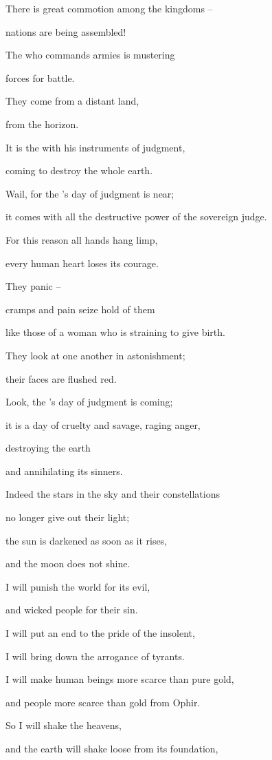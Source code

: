 {\par }{\Q There is great
commotion
among the kingdoms –
\par }{\Q nations
are being assembled!
\par }{\Q The
{}
who commands armies
is mustering
\par }{\Q forces
for battle.
\par }{\Q {}They come
from a distant
land,
\par }{\Q from the horizon.
\par }{\Q It is the
{}
with his instruments
of judgment,
\par }{\Q coming to destroy
the whole
earth.
\par }{\Q {}Wail,
for
the
{}’s
day
of judgment is near;
\par }{\Q it comes
with all the destructive
power of the sovereign judge.
\par }{\Q {}For this reason
all
hands
hang limp,
\par }{\Q every
human heart
loses
its courage.
\par }{\Q {}They panic
–
\par }{\Q cramps
and pain
seize hold
of them
\par }{\Q like those of a woman who is straining
to give birth.
\par }{\Q They look at
one
another
in astonishment;
\par }{\Q their faces
are flushed red.
\par }{\Q {}Look,
the
{}’s
day
of judgment is coming;
\par }{\Q it is a day of cruelty
and savage,
raging
anger,
\par }{\Q destroying
the earth
\par }{\Q and annihilating
its sinners.
\par }{\Q {}Indeed
the stars
in the sky
and their constellations
\par }{\Q no
longer give out
their light;
\par }{\Q the sun
is darkened
as soon as it rises,
\par }{\Q and the moon
does not
shine.
\par }{\Q I will punish
the world
for its evil,
\par }{\Q and wicked
people for their sin.
\par }{\Q I will put an end
to the pride
of the insolent,
\par }{\Q I will bring down
the arrogance
of tyrants.
\par }{\Q {}I will make human beings more scarce than pure gold,
\par }{\Q and people
more scarce than gold
from Ophir.
\par }{\Q {}So
I will shake
the heavens,
\par }{\Q and the earth
will shake
loose
from its
foundation,

}
